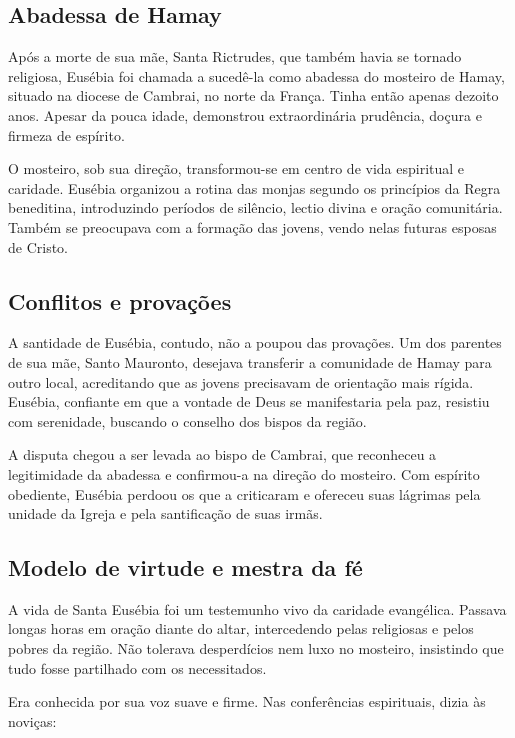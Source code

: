 \documentclass[a4paper,14pt]{extarticle} \usepackage[utf8]{inputenc}
\begin{document}
\subsection{Abadessa de Hamay}

Após a morte de sua mãe, Santa Rictrudes, que também havia se tornado religiosa, Eusébia foi chamada a sucedê-la como abadessa do mosteiro de Hamay, situado na diocese de Cambrai, no norte da França. Tinha então apenas dezoito anos. Apesar da pouca idade, demonstrou extraordinária prudência, doçura e firmeza de espírito.

O mosteiro, sob sua direção, transformou-se em centro de vida espiritual e caridade. Eusébia organizou a rotina das monjas segundo os princípios da Regra beneditina, introduzindo períodos de silêncio, lectio divina e oração comunitária. Também se preocupava com a formação das jovens, vendo nelas futuras esposas de Cristo.

\subsection{Conflitos e provações}

A santidade de Eusébia, contudo, não a poupou das provações. Um dos parentes de sua mãe, Santo Mauronto, desejava transferir a comunidade de Hamay para outro local, acreditando que as jovens precisavam de orientação mais rígida. Eusébia, confiante em que a vontade de Deus se manifestaria pela paz, resistiu com serenidade, buscando o conselho dos bispos da região.

A disputa chegou a ser levada ao bispo de Cambrai, que reconheceu a legitimidade da abadessa e confirmou-a na direção do mosteiro. Com espírito obediente, Eusébia perdoou os que a criticaram e ofereceu suas lágrimas pela unidade da Igreja e pela santificação de suas irmãs.

\subsection{Modelo de virtude e mestra da fé}

A vida de Santa Eusébia foi um testemunho vivo da caridade evangélica. Passava longas horas em oração diante do altar, intercedendo pelas religiosas e pelos pobres da região. Não tolerava desperdícios nem luxo no mosteiro, insistindo que tudo fosse partilhado com os necessitados.

Era conhecida por sua voz suave e firme. Nas conferências espirituais, dizia às noviças:
\end{document}
